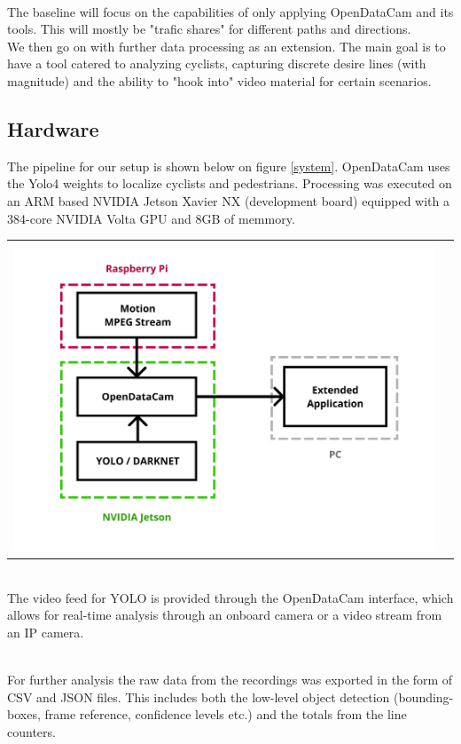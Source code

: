 \documentclass[
10pt, %
a4paper, %
oneside, %
headinclude,footinclude, %
] {book}%
\begin{document}
\ \\
The baseline will focus on the capabilities of only applying OpenDataCam and its tools. This will mostly be "trafic shares" for 
different paths and directions. 
\\ 
We then go on with further data processing as an extension. The main goal is to have a tool catered to analyzing cyclists, capturing
discrete desire lines (with magnitude) and the ability to "hook into" video material for certain scenarios.

\subsection{Hardware}
The pipeline for our setup is shown below on figure \ref{system}. OpenDataCam uses the Yolo4 weights to localize cyclists and pedestrians.
Processing was executed on an ARM based NVIDIA Jetson Xavier NX (development board) equipped with a 384-core NVIDIA Volta GPU
and 8GB of memmory. 

\raggedbottom
\noindent
\begin{tabular}{@{}cc}
\includegraphics[width=1.0\columnwidth]{system} 
\end{tabular}
\label{system}

\ \\
The video feed for YOLO is provided through the OpenDataCam interface, which allows for real-time analysis through an onboard camera
or a video stream from an IP camera. 

\ \\
For further analysis the raw data from the recordings was exported in the form of CSV and JSON files. This includes both the low-level
object detection (bounding-boxes, frame reference, confidence levels etc.) and the totals from the line counters.
\end{document}
